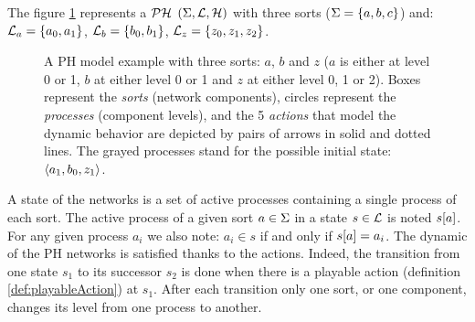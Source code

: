 \begin{example}
The figure \ref{fig:ph} represents a $\mathcal{PH}$ $(\Sigma,\mathcal{L},\mathcal{H})$ with three sorts
($\Sigma = \{a, b, c\}$) and:
$\mathcal{L}_a = \{a_0, a_1\}$,
$\mathcal{L}_b = \{b_0, b_1\}$,
$\mathcal{L}_z = \{z_0, z_1, z_2\}$.
\begin{figure}[ht]
\label{fig:ph} 
\centering
{}
\caption{
A PH model example with three sorts: $a$, $b$ and $z$ ($a$ is either at level 0 or 1, $b$ at either level 0 or 1 and $z$ at either level 0, 1 or 2). Boxes represent the \emph{sorts} (network components), circles represent the \emph{processes} (component levels), and the 5 \emph{actions} that model the dynamic behavior are depicted by pairs of arrows in solid and dotted lines. The grayed processes stand for the possible initial state: $\mbox{$\langle a_1, b_0, z_1 \rangle$}$.
}
\end{figure}
\end{example}

A state of the networks is a set of active processes containing a single process of each sort.
The active process of a given sort $a \in \Sigma$ in a state $s \in \mathcal{L}$
is noted ${s[a]}$.
For any given process $a_i$ we also note: $a_i \in s$ if and only if ${s[a]} = a_i$. The dynamic of the PH networks is satisfied thanks to the actions. Indeed, the transition from one state $s_1$ to its successor $s_2$ is done when there is a playable action (definition \ref{def:playableAction}) at $s_1$. After each transition only one sort, or one component, changes its level from one process to another.



